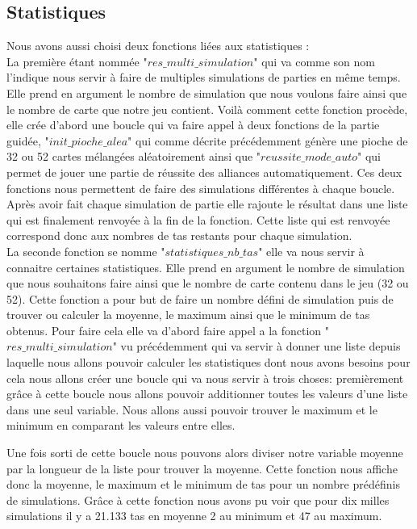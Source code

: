 \documentclass[10pt,a4paper,french,titlepage]{article}
\begin{document}
\subsection{Statistiques}
Nous avons aussi choisi deux fonctions liées aux statistiques : \\
La première étant nommée "$res\_multi\_simulation$" qui va comme son nom l'indique nous servir à faire de multiples simulations de parties en même temps. Elle prend en argument le nombre de simulation que nous voulons faire ainsi que le nombre de carte que notre jeu contient. Voilà comment cette fonction procède, elle crée d'abord une boucle qui va faire appel à deux fonctions de la partie guidée, "$init\_pioche\_alea$" qui comme décrite précédemment génère une pioche de 32 ou 52 cartes mélangées aléatoirement ainsi que "$reussite\_mode\_auto$" qui permet de jouer une partie de réussite des alliances automatiquement. Ces deux fonctions nous permettent de faire des simulations différentes à chaque boucle. Après avoir fait chaque simulation de partie elle rajoute le résultat dans une liste qui est finalement renvoyée à la fin de la fonction. Cette liste qui est renvoyée correspond donc aux nombres de tas restants pour chaque simulation.\\

La seconde fonction se nomme "$statistiques\_nb\_tas$" elle va nous servir à connaitre certaines statistiques. Elle prend en argument le nombre de simulation que nous souhaitons faire ainsi que le nombre de carte contenu dans le jeu (32 ou 52). Cette fonction a pour but de faire un nombre défini de simulation puis de trouver ou calculer la moyenne, le maximum ainsi que le minimum de tas obtenus. Pour faire cela elle va d'abord faire appel a la fonction "$res\_multi\_simulation$" vu précédemment qui va servir à donner une liste depuis laquelle nous allons pouvoir calculer les statistiques dont nous avons besoins pour cela nous allons créer une boucle qui va nous servir à trois choses: premièrement grâce à cette boucle nous allons pouvoir additionner toutes les valeurs d'une liste dans une seul variable. Nous allons aussi pouvoir trouver le maximum et le minimum en comparant les valeurs entre elles.

Une fois sorti de cette boucle nous pouvons alors diviser notre variable moyenne par la longueur de la liste pour trouver la moyenne. Cette fonction nous affiche donc la moyenne, le maximum et le minimum de tas pour un nombre prédéfinis de simulations. Grâce à cette fonction nous avons pu voir que pour dix milles simulations il y a 21.133 tas en moyenne 2 au minimum et 47 au maximum.
\end{document}
